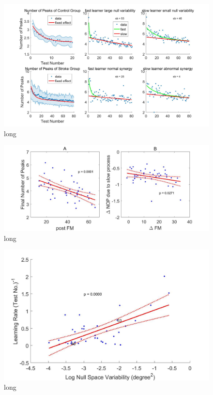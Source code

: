 \begin{figure}
	\centering
	\includegraphics[width=1\linewidth]{figures/3nopFixRan}
	\caption[short]{long}
	\label{fig:3nopfixran}
\end{figure}

\begin{figure}
	\centering
	\includegraphics[width=1\linewidth]{figures/4slowComponentIsRecovery}
	\caption[short]{long}
	\label{fig:4slowcomponentisrecovery}
\end{figure}

\begin{figure}
	\centering
	\includegraphics[width=1\linewidth]{figures/5learnRateVSnullVar}
	\caption[short]{long}
	\label{fig:5learnratevsnullvar}
\end{figure}

